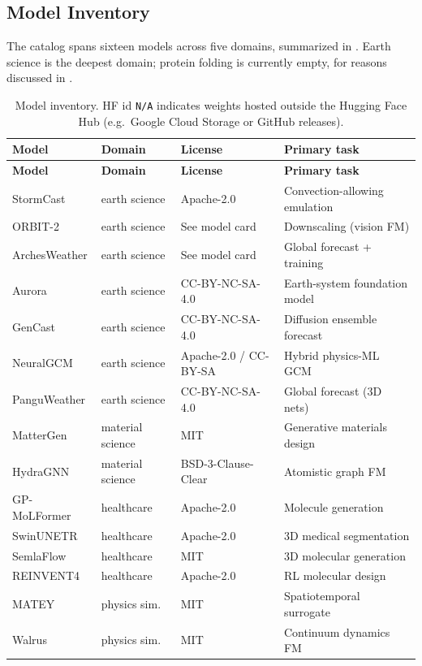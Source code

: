 \documentclass[11pt]{article}
\newcommand{\code}[1]{\texttt{#1}}
\begin{document}
\subsection{Model Inventory}
The catalog spans sixteen models across five domains, summarized in
. Earth science is the deepest domain; protein folding is
currently empty, for reasons discussed in .

\begin{longtable}{@{}p{2.7cm}p{2.5cm}p{3.2cm}p{3.6cm}@{}}
\caption{Model inventory. HF id \code{N/A} indicates weights hosted outside the
Hugging Face Hub (e.g.\ Google Cloud Storage or GitHub releases).}
\label{tab:inventory}\\
\toprule
\textbf{Model} & \textbf{Domain} & \textbf{License} & \textbf{Primary task} \\
\midrule
\endfirsthead
\toprule
\textbf{Model} & \textbf{Domain} & \textbf{License} & \textbf{Primary task} \\
\midrule
\endhead
\bottomrule
\endfoot
StormCast     & earth science    & Apache-2.0            & Convection-allowing emulation \\
ORBIT-2       & earth science    & See model card        & Downscaling (vision FM) \\
ArchesWeather & earth science    & See model card        & Global forecast + training \\
Aurora        & earth science    & CC-BY-NC-SA-4.0       & Earth-system foundation model \\
GenCast       & earth science    & CC-BY-NC-SA-4.0       & Diffusion ensemble forecast \\
NeuralGCM     & earth science    & Apache-2.0 / CC-BY-SA & Hybrid physics-ML GCM \\
PanguWeather  & earth science    & CC-BY-NC-SA-4.0       & Global forecast (3D nets) \\
MatterGen     & material science & MIT                   & Generative materials design \\
HydraGNN      & material science & BSD-3-Clause-Clear    & Atomistic graph FM \\
GP-MoLFormer  & healthcare       & Apache-2.0            & Molecule generation \\
SwinUNETR     & healthcare       & Apache-2.0            & 3D medical segmentation \\
SemlaFlow     & healthcare       & MIT                   & 3D molecular generation \\
REINVENT4     & healthcare       & Apache-2.0            & RL molecular design \\
MATEY         & physics sim.     & MIT                   & Spatiotemporal surrogate \\
Walrus        & physics sim.     & MIT                   & Continuum dynamics FM \\
\end{longtable}
\end{document}
